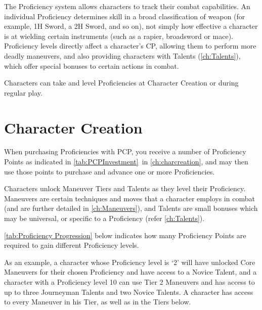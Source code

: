 \documentclass[oneside,11pt,english]{book}
\begin{document}
The Proficiency system allows characters to track their combat capabilities. An
individual Proficiency determines skill in a broad classification of weapon (for
example, 1H Sword, a 2H Sword, and so on), not simply how effective a character
is at wielding certain instruments (such as a rapier, broadsword or mace).
Proficiency levels directly affect a character’s CP, allowing them to perform
more deadly maneuvers, and also providing characters with Talents
(\autoref{ch:Talents}), which offer special bonuses to certain actions in
combat. 

Characters can take and level Proficiencies at Character Creation or during
regular play. 

\section{Character Creation}
When purchasing Proficiencies with PCP, you receive a number of Proficiency
Points as indicated in \autoref{tab:PCPInvestment}~in \autoref{ch:charcreation},
and may then use those points to purchase and advance one or more Proficiencies.

Characters unlock Maneuver Tiers and Talents as they level their Proficiency.
Maneuvers are certain techniques and moves that a character employs in combat
(and are further detailed in \autoref{ch:Maneuvers}), and Talents are small
bonuses which may be universal, or specific to a Proficiency (refer
\autoref{ch:Talents}).

\autoref{tab:Proficiency Progression} below indicates how many Proficiency
Points are required to gain different Proficiency levels.  

As an example, a character whose Proficiency level is ‘2’ will have unlocked
Core Maneuvers for their chosen Proficiency and have access to a Novice Talent,
and a character with a Proficiency level 10 can use Tier 2 Maneuvers and has
access to up to three Journeyman Talents and two Novice Talents. A character has
access to every Maneuver in his Tier, as well as in the Tiers below.  
\end{document}
